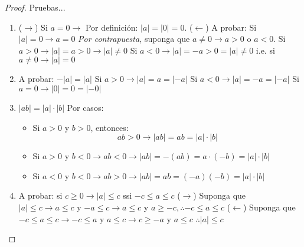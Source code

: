 \begin{proof}
Pruebas...
\begin{enumerate}
    \item 
    ($\to$) Si $a=0\to$ Por definición: $|a|=|0|=0$.
    \newline 
    ($\gets$) A probar: Si $|a|=0\to a=0$
    \newline 
    \textit{Por contrapuesta,} suponga que $a\neq 0\to a>0$ o $a<0$.  
    \newline 
    Si $a>0\to |a|=a>0\to |a|\neq 0$
    \newline 
    Si $a<0\to |a|=-a>0= |a|\neq 0$
    \newline 
    i.e. si $a\neq 0\to |a|= 0$
    \item A probar: $-|a|=|a|$
    \newline
    Si $a>0\to |a|=a=|-a|$
    \newline 
    Si $a<0\to |a|=-a=|-a|$
    \newline 
    Si $a=0\to |0|=0=|-0|$
    
    \item $|ab|=|a|\cdot |b|$\newline 
    Por casos:
    \begin{itemize}
        \item Si $a>0$ y $b>0$, entonces: $$ab>0\to |ab|=ab=|a|\cdot |b|$$
        \item Si $a>0$ y $b<0\to ab<0\to |ab|=-(ab)=a\cdot (-b)=|a|\cdot |b|$
        \item Si $a<0$ y $b<0\to ab>0\to |ab|=ab=(-a)(-b)=|a|\cdot |b|$
    \end{itemize}
    \item A probar: si $c\geq 0\to |a|\leq c$ ssi $-c\leq a\leq c$
    \newline 
    ($\to$) Suponga que $|a|\leq c\to a\leq c$ y $-a\leq c \to a\leq c$ y $a\geq -c, \therefore -c\leq a\leq c$
    \newline 
    ($\gets$) Suponga que $-c\leq a\leq c \to -c\leq a $ y $a\leq c\to c\geq -a$ y $a\leq c$ $\therefore |a|\leq c$
\end{enumerate}
\end{proof}



